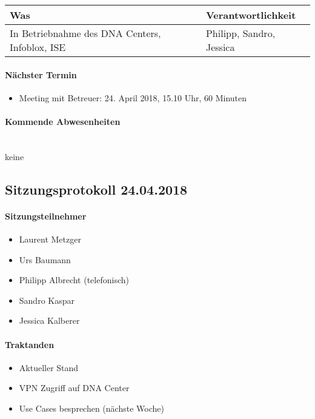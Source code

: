\begin{table}[H]
	\centering
	\begin{tabularx}{\textwidth}{X | p{4.5cm}}
		\rowcolor{gray!50}
		\textbf{Was} & \textbf{Verantwortlichkeit} \\
		\hline
		In Betriebnahme des DNA Centers, Infoblox, ISE & Philipp, Sandro, Jessica \\
	\end{tabularx}
	\label{tab:my-label}
\end{table}

\paragraph{Nächster Termin}
\begin{itemize}	
	\item Meeting mit Betreuer: 24. April 2018, 15.10 Uhr, 60 Minuten
\end{itemize}

\paragraph{Kommende Abwesenheiten} \mbox{}\\
keine


\newpage



\subsection{Sitzungsprotokoll 24.04.2018}

\paragraph{Sitzungsteilnehmer}
\begin{itemize}	
	\item Laurent Metzger 
	\item Urs Baumann
	\item Philipp Albrecht (telefonisch)
	\item Sandro Kaspar
	\item Jessica Kalberer
\end{itemize}

\paragraph{Traktanden}
\begin{itemize}	
	\item Aktueller Stand
	\item VPN Zugriff auf DNA Center
	\item Use Cases besprechen (nächste Woche)
\end{itemize}

